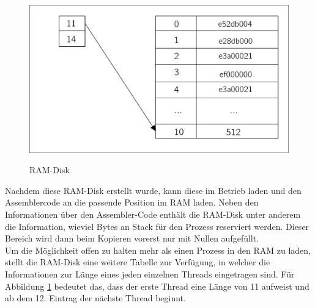 \begin{figure}[H]
	\begin{center}	
	\caption{RAM-Disk}
	\includegraphics[scale=0.60]{common/ramdisk.pdf}
	\label{ramdisk}
	\end{center}
\end{figure}
\noindent
Nachdem diese RAM-Disk erstellt wurde, kann \mops diese im Betrieb laden und den Assemblercode an die passende Position im RAM laden. Neben den Informationen \"uber den Assembler-Code enth\"alt die RAM-Disk unter anderem die Information, wieviel Bytes an Stack f\"ur den Prozess reserviert werden. Dieser Bereich wird dann beim Kopieren vorerst nur mit Nullen aufgef\"ullt. \\
Um die M\"oglichkeit offen zu halten mehr als einen Prozess in den RAM zu laden, stellt die RAM-Disk eine weitere Tabelle zur Verf\"ugung, in welcher die Informationen zur L\"ange eines jeden einzelnen Threads eingetragen sind. F\"ur Abbildung \ref{ramdisk} bedeutet das, dass der erste Thread eine L\"ange von 11 aufweist und ab dem 12. Eintrag der n\"achste Thread beginnt.
